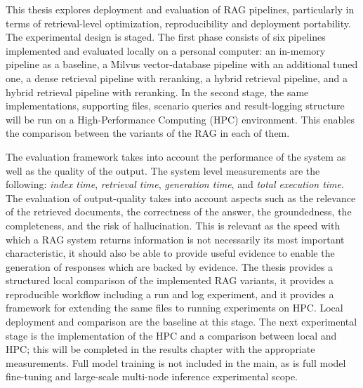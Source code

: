 This thesis explores deployment and evaluation of \ac{RAG} pipelines, particularly in terms of retrieval-level optimization, reproducibility and deployment portability. The experimental design is staged. The first phase consists of six pipelines implemented and evaluated locally on a personal computer: an in-memory pipeline as a baseline, a Milvus vector-database pipeline with an additional tuned one, a dense retrieval pipeline with reranking, a hybrid retrieval pipeline, and a hybrid retrieval pipeline with reranking. In the second stage, the same implementations, supporting files, scenario queries and result-logging structure will be run on a High-Performance Computing (HPC) environment. This enables the comparison between the variants of the RAG in each of them. 

The evaluation framework takes into account the performance of the system as well as the quality of the output. The system level measurements are the following: \textit{index time}, \textit{retrieval time}, \textit{generation time}, and \textit{total execution time}. The evaluation of output-quality takes into account aspects such as the relevance of the retrieved documents, the correctness of the answer, the groundedness, the completeness, and the risk of hallucination. This is relevant as the speed with which a RAG system returns information is not necessarily its most important characteristic, it should also be able to provide useful evidence to enable the generation of responses which are backed by evidence. The thesis provides a structured local comparison of the implemented RAG variants, it provides a reproducible workflow including a run and log experiment, and it provides a framework for extending the same files to running experiments on HPC. Local deployment and comparison are the baseline at this stage. The next experimental stage is the implementation of the HPC and a comparison between local and HPC; this will be completed in the results chapter with the appropriate measurements. Full model training is not included in the main, as is full model fine-tuning and large-scale multi-node inference experimental scope.

\clearpage
